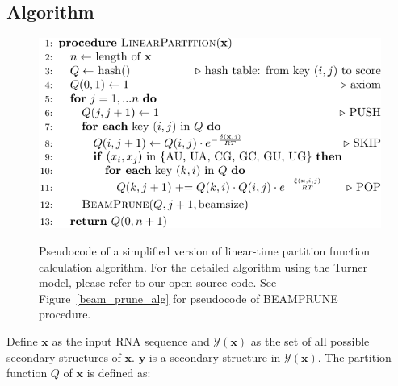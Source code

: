 
\subsection{\linearpartition Algorithm}

\begin{figure}[t]%
\center
\hspace{-0.23cm}\includegraphics[scale=.83]{figs/algorithm} \\[0.2cm]
\caption{
Pseudocode of a simplified version of linear-time partition function calculation algorithm.
For the detailed \linearpartition algorithm using the Turner model, please refer to our open source code.
See Figure~\ref{beam_prune_alg} for pseudocode of BEAMPRUNE procedure.
\label{algorithm}}
\vspace{-0.3cm}
\end{figure}

Define ${\mathbf x}$ as the input RNA sequence and $\mathcal{Y(\mathbf x)}$ as the set of all possible secondary structures of $\mathbf{x}$. $\mathbf{y}$ is a secondary structure 
in $\mathcal{Y(\mathbf x)}$. 
The partition function $Q$ of $\mathbf{x}$ is defined as:

